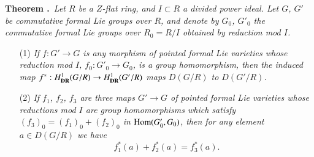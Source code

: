 \medskip
\noindent
{\bf Theorem .\label{art6-thm5.1.4}}~{\em Let $R$ be a $Z$-flat ring, and $I\subset R$ a divided power ideal. Let $G$, $G'$ be commutative formal Lie groups over $R$, and denote by $G_{0}$, $G'_{0}$ the commutative formal Lie groups over $R_{0}=R/I$ obtained by reduction mod $I$.}
\begin{itemize}
\item[(1)] {\em If $f:G'\to G$ is any morphism of pointed formal Lie varieties whose reduction mod $I$, $f_{0}:G'_{0}\to G_{0}$, is a group homomorphism, then the induced map $f^{*}:H^{1}_{\mathbf{DR}}(G/R)\to H^{1}_{\mathbf{DR}}(G'/R)$ maps $D(G/R)$ to $D(G'/R)$.}

\item[(2)] {\em If $f_{1}$, $f_{2}$, $f_{3}$ are three maps $G'\to G$ of pointed formal Lie varieties whose reductions mod $I$ are group homomorphisms which satisfy $(f_{3})_{0}=(f_{1})_{0}+(f_{2})_{0}$ in $\operatorname{Hom}(G'_{0},G_{0})$, then for any element $a\in D(G/R)$ we have}
$$
f^{*}_{1}(a)+f^{*}_{2}(a)=f^{*}_{3}(a).
$$
\end{itemize}

